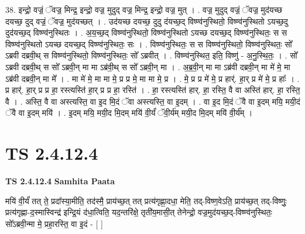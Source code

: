 \documentclass[17pt]{extarticle}
\begin{document}
38. इन्द्रो॒ वज्रं॒ ॅवज्र॒ मिन्द्र॒ इन्द्रो॒ वज्र॒ मुदुद् वज्र॒ मिन्द्र॒ इन्द्रो॒ वज्र॒ मुत् । . वज्र॒ मुदुद् वज्रं॒ ॅवज्र॒ मुद॑यच्छ दयच्छ॒ दुद् वज्रं॒ ॅवज्र॒ मुद॑यच्छत् । . उद॑यच्छ दयच्छ॒ दुदु द॑यच्छ॒द् विष्ण्व॑नुस्थितो॒ विष्ण्व॑नुस्थितो ऽयच्छ॒दु दुद॑यच्छ॒द् विष्ण्व॑नुस्थितः । . अ॒य॒च्छ॒द् विष्ण्व॑नुस्थितो॒ विष्ण्व॑नुस्थितो ऽयच्छ दयच्छ॒द् विष्ण्व॑नुस्थितः॒ स स विष्ण्व॑नुस्थितो ऽयच्छ दयच्छ॒द् विष्ण्व॑नुस्थितः॒ सः । . विष्ण्व॑नुस्थितः॒ स स विष्ण्व॑नुस्थितो॒ विष्ण्व॑नुस्थितः॒ सो᳚ ऽब्रवी दब्रवी॒थ् स विष्ण्व॑नुस्थितो॒ विष्ण्व॑नुस्थितः॒ सो᳚ ऽब्रवीत् । . विष्ण्व॑नुस्थित॒ इति॒ विष्णु॑ - अ॒नु॒स्थि॒तः॒ । . सो᳚ ऽब्रवी दब्रवी॒थ् स सो᳚ ऽब्रवी॒न् मा मा ऽब्र॑वी॒थ् स सो᳚ ऽब्रवी॒न् मा । . अ॒ब्र॒वी॒न् मा मा ऽब्र॑वी दब्रवी॒न् मा मे॑ मे॒ मा ऽब्र॑वी दब्रवी॒न् मा मे᳚ । . मा मे॑ मे॒ मा मा मे॒ प्र प्र मे॒ मा मा मे॒ प्र । . मे॒ प्र प्र मे॑ मे॒ प्र हार्॑. हा॒र् प्र मे॑ मे॒ प्र हाः᳚ । . प्र हार्॑. हा॒र् प्र प्र हा॒ रस्त्यस्ति॑ हा॒र् प्र प्र हा॒ रस्ति॑ । . हा॒ रस्त्यस्ति॑ हार्. हा॒ रस्ति॒ वै वा अस्ति॑ हार्. हा॒ रस्ति॒ वै । . अस्ति॒ वै वा अस्त्यस्ति॒ वा इ॒द मि॒दं ॅवा अस्त्यस्ति॒ वा इ॒दम् । . वा इ॒द मि॒दं ॅवै वा इ॒दम् मयि॒ मयी॒दं ॅवै वा इ॒दम् मयि॑ । . इ॒दम् मयि॒ मयी॒द मि॒दम् मयि॑ वी॒र्यं॑ ॅवी॒र्य॑म् मयी॒द मि॒दम् मयि॑ वी॒र्य᳚म् । \newline
\pagebreak
{}
\section*{ TS 2.4.12.4 }

\textbf{TS 2.4.12.4 } \newline
\textbf{Samhita Paata} \newline

मयि॑ वी॒र्यं॑ तत् ते॒ प्रदा᳚स्या॒मीति॒ तद॑स्मै॒ प्राय॑च्छ॒त् तत् प्रत्य॑गृह्णा॒दधा॒ मेति॒ तद्-विष्ण॒वेऽति॒ प्राय॑च्छ॒त् तद्-विष्णुः॒ प्रत्य॑गृह्णा-द॒स्मास्विन्द्र॑ इन्द्रि॒यं द॑धा॒त्विति॒ यद॒न्तरि॑क्षे॒ तृती॑य॒मासी॒त् तेनेन्द्रो॒ वज्र॒मुद॑यच्छ॒द्-विष्ण्व॑नुस्थितः॒ सो᳚ऽब्रवी॒न्मा मे॒ प्रहा॒रस्ति॒ वा इ॒दं - [  ] \newline
\end{document}
